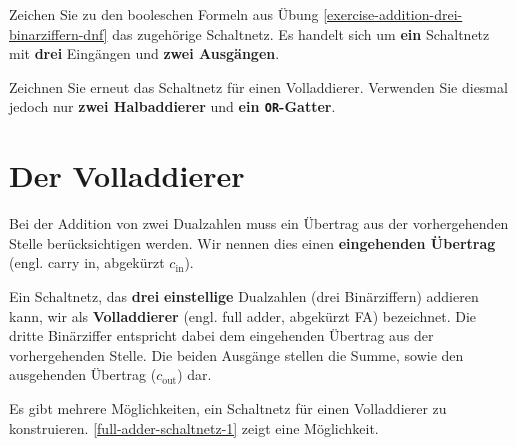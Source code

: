 \newpage

\begin{exercise}
Zeichen Sie zu den booleschen Formeln aus Übung \ref{exercise-addition-drei-binarziffern-dnf} das zugehörige Schaltnetz. Es handelt sich um \textbf{ein} Schaltnetz mit \textbf{drei} Eingängen und \textbf{zwei Ausgängen}.

\fillwithgrid{6in}

\end{exercise}

\begin{exercise}
Zeichnen Sie erneut das Schaltnetz für einen Volladdierer. Verwenden Sie diesmal jedoch nur \textbf{zwei Halbaddierer} und \textbf{ein \texttt{OR}-Gatter}.
\end{exercise}

\newpage

\section{Der Volladdierer}

Bei der Addition von zwei Dualzahlen muss ein Übertrag aus der vorhergehenden Stelle berücksichtigen werden. Wir nennen dies einen \textbf{eingehenden Übertrag} (engl. carry in, abgekürzt $c_{\text{in}}$). 

\begin{definition}[Volladdierer]
Ein Schaltnetz, das \textbf{drei} \textbf{einstellige} Dualzahlen (drei Binärziffern) addieren kann, wir als \textbf{Volladdierer} (engl. full adder, abgekürzt \acs{FA}) bezeichnet. Die dritte Binärziffer entspricht dabei dem eingehenden Übertrag aus der vorhergehenden Stelle. Die beiden Ausgänge stellen die Summe, sowie den ausgehenden Übertrag ($c_{\text{out}}$) dar.
\end{definition}

Es gibt mehrere Möglichkeiten, ein Schaltnetz für einen Volladdierer zu konstruieren. \autoref{full-adder-schaltnetz-1} zeigt eine Möglichkeit.

